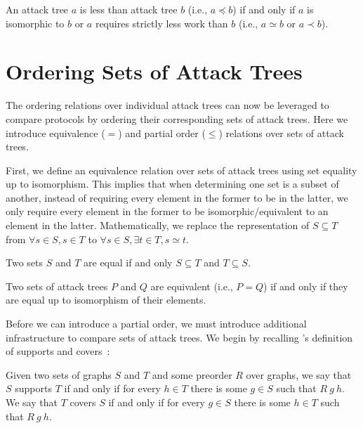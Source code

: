 \documentclass[runningheads]{llncs}
\theoremstyle{definition}
\begin{document}
\begin{definition}
  An attack tree $a$ is less than attack tree $b$ (i.e., $a \preceq
  b$) if and only if $a$ is isomorphic to $b$ or $a$ requires strictly
  less work than $b$ (i.e., $a \simeq b$ or $a \prec b$). 
\end{definition}


\section{Ordering Sets of Attack Trees}

The ordering relations over individual attack trees can now be
leveraged to compare protocols by ordering their corresponding sets of
attack trees. Here we introduce equivalence ($=$) and partial order
($\le$) relations over sets of attack trees.

First, we define an equivalence relation over sets of attack trees
using set equality up to isomorphism. This implies that when
determining one set is a subset of another, instead of requiring every
element in the former to be in the latter, we only require every
element in the former to be isomorphic/equivalent to an element in the
latter. Mathematically, we replace the representation of
$S \subseteq T$ from $\forall s \in S, s \in T$ to
$\forall s \in S, \exists t \in T, s \simeq t$.

\begin{definition}
  Two sets $S$ and $T$ are equal if and only $S \subseteq T$ and $T
  \subseteq S$. 
\end{definition}

\begin{definition}[Equivalence =]
  Two sets of attack trees $P$ and $Q$ are equivalent (i.e., $P =
  Q$) if and only if they are equal up to isomorphism of their
  elements.
\end{definition}

Before we can introduce a partial order, we must introduce additional
infrastructure to compare sets of attack trees. We begin by recalling
\citeauthor{Rowe:2021:OnOrdering}'s definition of supports and
covers~\citep{Rowe:2021:OnOrdering}: 

\begin{definition}
    Given two sets of graphs $S$ and $T$ and some preorder $R$ over
    graphs, we say that $S$ supports $T$ if and only if for every $h
    \in T$ there is some $g \in S$ such that $R\: g\: h$. We  say
    that $T$ covers $S$ if and only if for every $g \in S$ there is
    some $h \in T$ such that $R\: g\: h$. 
\end{definition}
\end{document}

